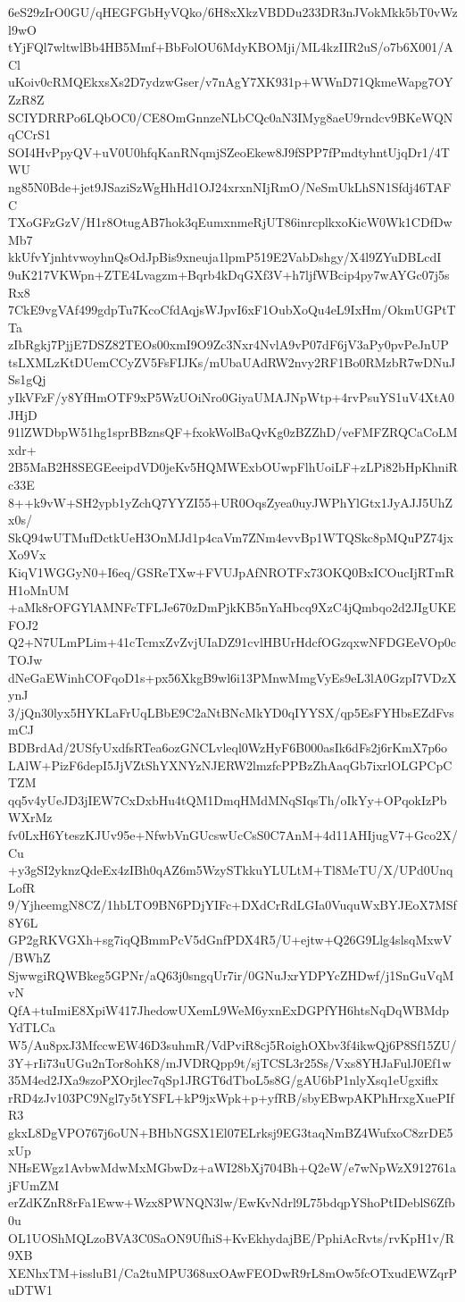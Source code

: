 6eS29zIrO0GU/qHEGFGbHyVQko/6H8xXkzVBDDu233DR3nJVokMkk5bT0vWzl9wO
tYjFQl7wltwlBb4HB5Mmf+BbFolOU6MdyKBOMji/ML4kzIIR2uS/o7b6X001/ACl
uKoiv0cRMQEkxsXs2D7ydzwGser/v7nAgY7XK931p+WWnD71QkmeWapg7OYZzR8Z
SCIYDRRPo6LQbOC0/CE8OmGnnzeNLbCQc0aN3IMyg8aeU9rndcv9BKeWQNqCCrS1
SOI4HvPpyQV+uV0U0hfqKanRNqmjSZeoEkew8J9fSPP7fPmdtyhntUjqDr1/4TWU
ng85N0Bde+jet9JSaziSzWgHhHd1OJ24xrxnNIjRmO/NeSmUkLhSN1Sfdj46TAFC
TXoGFzGzV/H1r8OtugAB7hok3qEumxnmeRjUT86inrcplkxoKicW0Wk1CDfDwMb7
kkUfvYjnhtvwoyhnQsOdJpBis9xneuja1lpmP519E2VabDshgy/X4l9ZYuDBLcdI
9uK217VKWpn+ZTE4Lvagzm+Bqrb4kDqGXf3V+h7ljfWBcip4py7wAYGc07j5sRx8
7CkE9vgVAf499gdpTu7KcoCfdAqjsWJpvI6xF1OubXoQu4eL9IxHm/OkmUGPtTTa
zIbRgkj7PjjE7DSZ82TEOs00xmI9O9Zc3Nxr4NvlA9vP07dF6jV3aPy0pvPeJnUP
tsLXMLzKtDUemCCyZV5FsFIJKs/mUbaUAdRW2nvy2RF1Bo0RMzbR7wDNuJSs1gQj
yIkVFzF/y8YfHmOTF9xP5WzUOiNro0GiyaUMAJNpWtp+4rvPsuYS1uV4XtA0JHjD
91lZWDbpW51hg1sprBBznsQF+fxokWolBaQvKg0zBZZhD/veFMFZRQCaCoLMxdr+
2B5MaB2H8SEGEeeipdVD0jeKv5HQMWExbOUwpFlhUoiLF+zLPi82bHpKhniRc33E
8++k9vW+SH2ypb1yZchQ7YYZI55+UR0OqsZyea0uyJWPhYlGtx1JyAJJ5UhZx0s/
SkQ94wUTMufDctkUeH3OnMJd1p4caVm7ZNm4evvBp1WTQSkc8pMQuPZ74jxXo9Vx
KiqV1WGGyN0+I6eq/GSReTXw+FVUJpAfNROTFx73OKQ0BxICOucIjRTmRH1oMnUM
+aMk8rOFGYlAMNFcTFLJe670zDmPjkKB5nYaHbcq9XzC4jQmbqo2d2JIgUKEFOJ2
Q2+N7ULmPLim+41cTcmxZvZvjUIaDZ91cvlHBUrHdcfOGzqxwNFDGEeVOp0cTOJw
dNeGaEWinhCOFqoD1s+px56XkgB9wl6i13PMnwMmgVyEs9eL3lA0GzpI7VDzXynJ
3/jQn30lyx5HYKLaFrUqLBbE9C2aNtBNcMkYD0qIYYSX/qp5EsFYHbsEZdFvsmCJ
BDBrdAd/2USfyUxdfsRTea6ozGNCLvleql0WzHyF6B000asIk6dFs2j6rKmX7p6o
LAlW+PizF6depI5JjVZtShYXNYzNJERW2lmzfcPPBzZhAaqGb7ixrlOLGPCpCTZM
qq5v4yUeJD3jIEW7CxDxbHu4tQM1DmqHMdMNqSIqsTh/oIkYy+OPqokIzPbWXrMz
fv0LxH6YteszKJUv95e+NfwbVnGUcswUcCsS0C7AnM+4d11AHIjugV7+Gco2X/Cu
+y3gSI2yknzQdeEx4zIBh0qAZ6m5WzySTkkuYLULtM+Tl8MeTU/X/UPd0UnqLofR
9/YjheemgN8CZ/1hbLTO9BN6PDjYIFc+DXdCrRdLGIa0VuquWxBYJEoX7MSf8Y6L
GP2gRKVGXh+sg7iqQBmmPcV5dGnfPDX4R5/U+ejtw+Q26G9Llg4slsqMxwV/BWhZ
SjwwgiRQWBkeg5GPNr/aQ63j0sngqUr7ir/0GNuJxrYDPYcZHDwf/j1SnGuVqMvN
QfA+tuImiE8XpiW417JhedowUXemL9WeM6yxnExDGPfYH6htsNqDqWBMdpYdTLCa
W5/Au8pxJ3MfccwEW46D3suhmR/VdPviR8cj5RoighOXbv3f4ikwQj6P8Sf15ZU/
3Y+rIi73uUGu2nTor8ohK8/mJVDRQpp9t/sjTCSL3r25Ss/Vxs8YHJaFulJ0Ef1w
35M4ed2JXa9szoPXOrjlec7qSp1JRGT6dTboL5s8G/gAU6bP1nlyXsq1eUgxiflx
rRD4zJv103PC9Ngl7y5tYSFL+kP9jxWpk+p+yfRB/sbyEBwpAKPhHrxgXuePIfR3
gkxL8DgVPO767j6oUN+BHbNGSX1El07ELrksj9EG3taqNmBZ4WufxoC8zrDE5xUp
NHsEWgz1AvbwMdwMxMGbwDz+aWI28bXj704Bh+Q2eW/e7wNpWzX912761ajFUmZM
erZdKZnR8rFa1Eww+Wzx8PWNQN3lw/EwKvNdrl9L75bdqpYShoPtIDeblS6Zfb0u
OL1UOShMQLzoBVA3C0SaON9UfhiS+KvEkhydajBE/PphiAcRvts/rvKpH1v/R9XB
XENhxTM+issluB1/Ca2tuMPU368uxOAwFEODwR9rL8mOw5fcOTxudEWZqrPuDTW1
